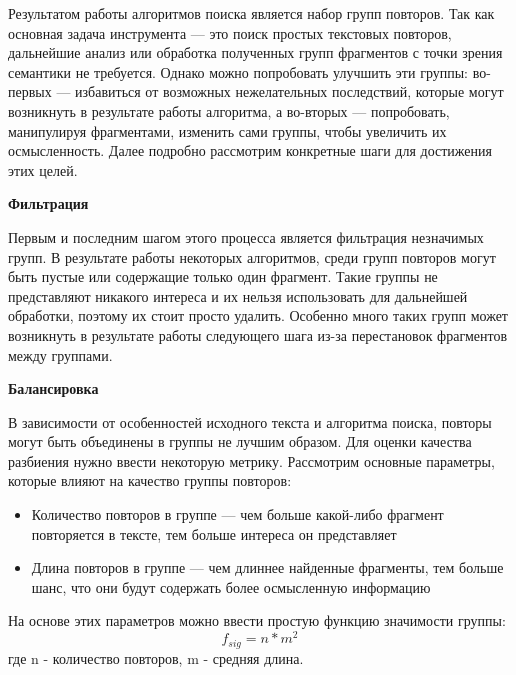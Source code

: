 \documentclass[14pt]{matmex-diploma-custom}
\begin{document}
Результатом работы алгоритмов поиска является набор групп повторов. Так как основная задача инструмента --- это поиск простых текстовых повторов, дальнейшие анализ или обработка полученных групп фрагментов с точки зрения семантики не требуется. Однако можно попробовать улучшить эти группы: во-первых --- избавиться от возможных нежелательных последствий, которые могут возникнуть в результате работы алгоритма, а во-вторых --- попробовать, манипулируя фрагментами, изменить сами группы, чтобы увеличить их осмысленность. Далее подробно рассмотрим конкретные шаги для достижения этих целей.

\textbf{Фильтрация}

Первым и последним шагом этого процесса является фильтрация незначимых групп. В результате работы некоторых алгоритмов, среди групп повторов могут быть пустые или содержащие только один фрагмент. Такие группы не представляют никакого интереса и их нельзя использовать для дальнейшей обработки, поэтому их стоит просто удалить. Особенно много таких групп может возникнуть в результате работы следующего шага из-за перестановок фрагментов между группами.

\textbf{Балансировка}

В зависимости от особенностей исходного текста и алгоритма поиска, повторы могут быть объединены в группы не лучшим образом. Для оценки качества разбиения нужно ввести некоторую метрику. Рассмотрим основные параметры, которые влияют на качество группы повторов:

\begin{itemize}
	\item Количество повторов в группе --- чем больше какой-либо фрагмент повторяется в тексте, тем больше интереса он представляет
	\item Длина повторов в группе --- чем длиннее найденные фрагменты, тем больше шанс, что они будут содержать более осмысленную информацию
\end{itemize}

На основе этих параметров можно ввести простую функцию значимости группы:
\begin{equation}
	f_{sig} = n * m^2
\end{equation}
где n - количество повторов, m - средняя длина.
\end{document}
